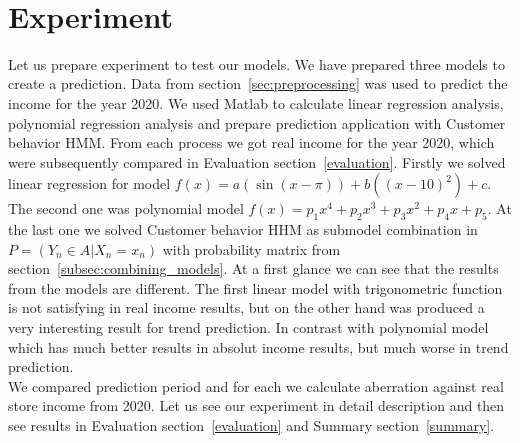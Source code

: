 \\
\section{Experiment} \label{experiment}
Let us prepare experiment to test our models.
We have prepared three models to create a prediction.
Data from section~\ref{sec:preprocessing} was used to predict the income for the year 2020.
We used Matlab to calculate linear regression analysis, polynomial regression analysis and prepare prediction application with Customer behavior HMM.
From each process we got real income for the year 2020, which were subsequently compared in Evaluation section~\ref{evaluation}.
Firstly we solved linear regression for model $f(x) = a(\sin(x-\pi))+b((x-10)^2)+c$.
The second one was polynomial model $f(x) = p_1x^4 + p_2x^3 + p_3x^2 + p_4x + p_5$.
At the last one we solved Customer behavior HHM as submodel combination in $P = (Y_n \in A|X_n = x_n)$ with probability matrix from section~\ref{subsec:combining_models}.
At a first glance we can see that the results from the models are different.
The first linear model with trigonometric function is not satisfying in real income results, but on the other hand was produced a very interesting result for trend prediction.
In contrast with polynomial model which has much better results in absolut income results, but much worse in trend prediction.\\
We compared prediction period and for each we calculate aberration against real store income from 2020.
Let us see our experiment in detail description and then see results in Evaluation section~\ref{evaluation} and Summary section~\ref{summary}.\\
